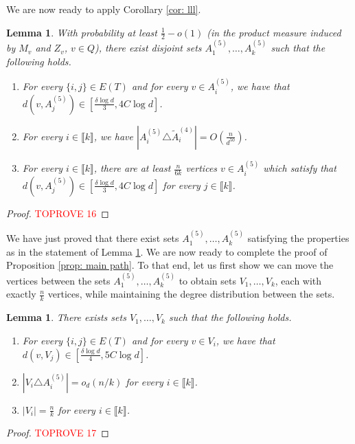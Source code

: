 \documentclass[notitlepage]{scrartcl}
\newcommand{\br}[1]{\llbracket{#1}\rrbracket}
\newtheorem{lemma}[thm]{Lemma}
\begin{document}
We are now ready to apply Corollary \ref{cor: lll}.
\begin{lemma}\label{l: final lll}
With probability at least $\frac{1}{2}-o(1)$ (in the product measure induced by $M_v$ and $Z_v$, $v\in Q$), there exist disjoint sets $A_1^{(5)},\ldots, A_k^{(5)}$ such that the following holds.
\begin{enumerate}
    \item For every $\{i,j\}\in E(T)$ and for every $v\in A_i^{(5)}$, we have that $d(v,A_j^{(5)})\in \left[\frac{\delta\log d}{3},4C\log d\right]$.
    \item For every $i\in \br{k}$, we have $\left|A_i^{(5)}\triangle \tilde{A}_i^{(4)}\right|=O\left(\frac{n}{d^{50}}\right)$.\label{l: final lll item distance}
    \item For every $i\in \br{k}$, there are at least $\frac{n}{6k}$ vertices $v\in A_i^{(5)}$ which satisfy that $d(v,A_j^{(5)})\in \left[\frac{\delta\log d}{3},4C\log d\right]$ for every $j \in \br{k}$. 
\end{enumerate}
\end{lemma}
\begin{proof}\textcolor{red}{TOPROVE 16}\end{proof}
We have just proved that there exist sets $A_1^{(5)},\ldots, A_k^{(5)}$ satisfying the properties as in the statement of Lemma \ref{l: final lll}. We are now ready to complete the proof of Proposition \ref{prop: main path}. To that end, let us first show we can move the vertices between the sets $A_1^{(5)},\ldots, A_k^{(5)}$ to obtain sets $V_1,\ldots,V_k$, each with exactly $\frac{n}{k}$ vertices, while maintaining the degree distribution between the sets.
\begin{lemma}\label{l: final round}
There exists sets $V_1,\ldots,V_k$ such that the following holds.
\begin{enumerate}
    \item For every $\{i,j\}\in E(T)$ and for every $v\in V_i$, we have that $d(v,V_j)\in \left[\frac{\delta\log d}{4},5C\log d\right]$.
    \item $\left|V_i\triangle A_i^{(5)}\right|=o_d(n/k)$ for every $i\in \br{k}$.\label{l: final item distance}
    \item $|V_i|=\frac{n}{k}$ for every $i\in \br{k}$.
\end{enumerate}
\end{lemma}
\begin{proof}\textcolor{red}{TOPROVE 17}\end{proof}
\end{document}
